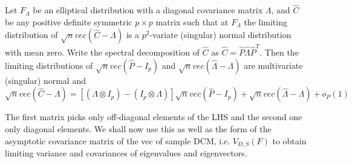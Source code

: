\documentclass[fleqn,11pt]{article}
\begin{document}
\begin{Theorem} \label{Theorem:decomp} \citep{taskinen12}
Let $F_\Lambda$ be an elliptical distribution with a diagonal covariance matrix $\Lambda$, and $\hat C$ be any positive definite symmetric $p \times p$ matrix such that at $F_\Lambda$ the limiting distribution of $\sqrt n vec(\hat C - \Lambda)$ is a $p^2$-variate (singular) normal distribution with mean zero. Write the spectral decomposition of $\hat C$ as $\hat C = \hat P \hat\Lambda \hat P^T$. Then the limiting distributions of $\sqrt n vec(\hat P - I_p)$ and $\sqrt n vec(\hat\Lambda - \Lambda)$ are multivariate (singular) normal and
%
\begin{equation} \label{equation:decompEq}
\sqrt n vec (\hat C - \Lambda)  = \left[ (\Lambda \otimes I_p) - (I_p \otimes \Lambda) \right] \sqrt n vec (\hat P - I_p) + \sqrt n vec (\hat\Lambda - \Lambda) + o_P(1)
\end{equation}
\end{Theorem}

The first matrix picks only off-diagonal elements of the LHS and the second one only diagonal elements. We shall now use this as well as the form of the asymptotic covariance matrix of the vec of sample DCM, i.e. $V_{D,S}(F)$ to obtain limiting variance and covariances of eigenvalues and eigenvectors.
\end{document}
